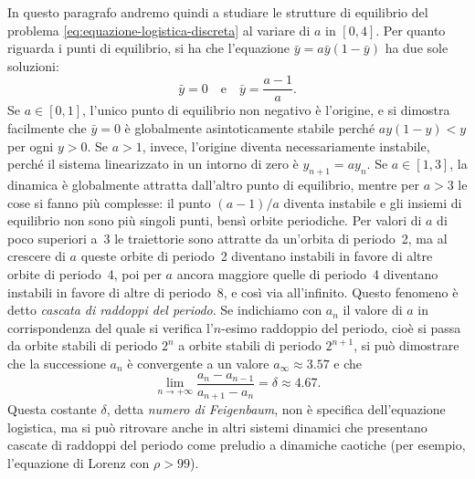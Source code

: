 \noindent In questo paragrafo andremo quindi a studiare le strutture di equilibrio
del problema \eqref{eq:equazione-logistica-discreta} al variare di $a$ in $[0,4]$.
Per quanto riguarda i punti di equilibrio, si ha che l'equazione
$\bar{y} = a \bar{y}(1-\bar{y})$ ha due sole soluzioni:
\[
\bar{y} = 0 \quad \text{e} \quad \bar{y} = \frac{a-1}{a}.
\]
Se $a \in [0,1]$, l'unico punto di equilibrio non negativo è l'origine,
e si dimostra facilmente che $\bar{y} = 0$ è globalmente asintoticamente stabile
perché $ay(1-y) < y$ per ogni $y > 0$.
Se $a > 1$, invece, l'origine diventa necessariamente instabile, perché
il sistema linearizzato in un intorno di zero è $y_{n+1} = a y_n$.
Se $a \in [1,3]$, la dinamica è globalmente attratta dall'altro punto di equilibrio,
mentre per $a > 3$ le cose si fanno più complesse: il punto $(a-1)/a$ diventa
instabile e gli insiemi di equilibrio non sono più singoli punti, bensì orbite
periodiche. Per valori di $a$ di poco superiori a~3 le traiettorie sono attratte
da un'orbita di periodo~2, ma al crescere di $a$ queste orbite di periodo~2
diventano instabili in favore di altre orbite di periodo~4, poi per
$a$ ancora maggiore quelle di periodo~4 diventano instabili in favore di altre
di periodo~8, e così via all'infinito. Questo fenomeno è detto \emph{cascata
di raddoppi del periodo}. Se indichiamo con $a_n$ il valore di $a$ in corrispondenza
del quale si verifica l'$n$-esimo raddoppio del periodo, cioè si passa da
orbite stabili di periodo $2^n$ a orbite stabili di periodo $2^{n+1}$, si
può dimostrare che la successione $a_n$ è convergente a un valore
$a_{\infty} \approx 3.57$ e che
\[
\lim_{n \to +\infty} \frac{a_n - a_{n-1}}{a_{n+1}-a_n} = \delta \approx 4.67.
\]
Questa costante $\delta$, detta \emph{numero di Feigenbaum}, non è specifica
dell'equazione logistica, ma si può ritrovare anche in altri sistemi dinamici
che presentano cascate di raddoppi del periodo come preludio a dinamiche
caotiche (per esempio, l'equazione di Lorenz con $\rho > 99$).

